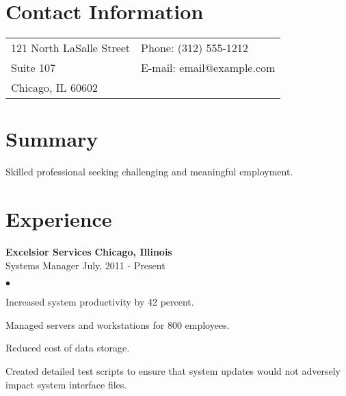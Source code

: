 \documentclass[margin,line]{res}
\newenvironment{list2}{
  \begin{list}{$\bullet$}{%
      \setlength{\itemsep}{0in} 
      \setlength{\parsep}{0in} \setlength{\parskip}{0in}
      \setlength{\topsep}{0in} \setlength{\partopsep}{0in} 
      \setlength{\leftmargin}{0.2in}}}{\end{list}}
\begin{document}

\begin{resume}
\section{\sc Contact Information}
\vspace{.05in}
\begin{tabular}{@{}p{2in}p{4in}}
121 North LaSalle Street  	& {Phone:}    (312) 555-1212 \\            
Suite 107			              & {E-mail:}   email@example.com \\         
Chicago, IL 60602 \\       
\end{tabular}


\section{\sc Summary}
Skilled professional seeking challenging and meaningful employment.

\section{\sc Experience}
{\bf Excelsior Services} 	\hfill {\bf Chicago, Illinois}\\
\vspace{-.3cm}
{Systems Manager} \hfill {July, 2011 - Present}\\
\vspace*{-.0in}
\begin{list2}
\item Increased system productivity by 42 percent. 
\item Managed servers and workstations for 800 employees.
\item Reduced cost of data storage.
\item Created detailed test scripts to ensure that system updates would not 
adversely impact system interface files.
\end{list2}


\end{resume}
\end{document}
